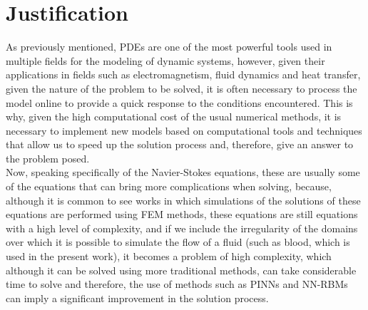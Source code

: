\documentclass[12pt,letterpaper]{article}
\begin{document}
\section{Justification}

As previously mentioned, PDEs are one of the most powerful tools used in multiple fields for the modeling of dynamic systems, however, given their applications in fields such as electromagnetism, fluid dynamics and heat transfer, given the nature of the problem to be solved, it is often necessary to process the model online to provide a quick response to the conditions encountered. This is why, given the high computational cost of the usual numerical methods, it is necessary to implement new models based on computational tools and techniques that allow us to speed up the solution process and, therefore, give an answer to the problem posed.\\

Now, speaking specifically of the Navier-Stokes equations, these are usually some of the equations that can bring more complications when solving, because, although it is common to see works in which simulations of the solutions of these equations are performed using FEM methods, these equations are still equations with a high level of complexity, and if we include the irregularity of the domains over which it is possible to simulate the flow of a fluid (such as blood, which is used in the present work), it becomes a problem of high complexity, which although it can be solved using more traditional methods, can take considerable time to solve and therefore, the use of methods such as PINNs and NN-RBMs can imply a significant improvement in the solution process.\\
\end{document}
